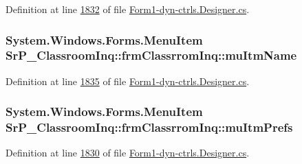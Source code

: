 \-Definition at line \hyperlink{_form1-dyn-ctrls_8_designer_8cs_source_l01832}{1832} of file \hyperlink{_form1-dyn-ctrls_8_designer_8cs_source}{\-Form1-\/dyn-\/ctrls.\-Designer.\-cs}.

\hypertarget{class_sr_p___classroom_inq_1_1frm_classrrom_inq_a62421b36b63800d99afde1f0494d3e5f}{
\subsubsection[{mu\-Itm\-Name}]{\setlength{\rightskip}{0pt plus 5cm}\-System.\-Windows.\-Forms.\-Menu\-Item {\bf \-Sr\-P\-\_\-\-Classroom\-Inq\-::frm\-Classrrom\-Inq\-::mu\-Itm\-Name}}}
\label{class_sr_p___classroom_inq_1_1frm_classrrom_inq_a62421b36b63800d99afde1f0494d3e5f}


\-Definition at line \hyperlink{_form1-dyn-ctrls_8_designer_8cs_source_l01835}{1835} of file \hyperlink{_form1-dyn-ctrls_8_designer_8cs_source}{\-Form1-\/dyn-\/ctrls.\-Designer.\-cs}.

\hypertarget{class_sr_p___classroom_inq_1_1frm_classrrom_inq_a13631d0933d2eb8825ef015322073644}{
\subsubsection[{mu\-Itm\-Prefs}]{\setlength{\rightskip}{0pt plus 5cm}\-System.\-Windows.\-Forms.\-Menu\-Item {\bf \-Sr\-P\-\_\-\-Classroom\-Inq\-::frm\-Classrrom\-Inq\-::mu\-Itm\-Prefs}}}
\label{class_sr_p___classroom_inq_1_1frm_classrrom_inq_a13631d0933d2eb8825ef015322073644}


\-Definition at line \hyperlink{_form1-dyn-ctrls_8_designer_8cs_source_l01830}{1830} of file \hyperlink{_form1-dyn-ctrls_8_designer_8cs_source}{\-Form1-\/dyn-\/ctrls.\-Designer.\-cs}.

